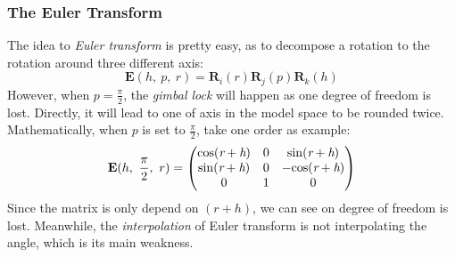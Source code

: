\documentclass[10pt, a4paper]{article}
\begin{document}
            \subsubsection{The Euler Transform}
                The idea to \emph{Euler transform} is pretty easy, as to decompose a rotation to the rotation around three different axis:
                $$\textbf{E}(h,\ p,\ r) = \textbf{R}_i(r)\textbf{R}_j(p)\textbf{R}_k(h)$$
                \indent However, when $p = \frac{\pi}{2}$, the \emph{gimbal lock} will happen as one degree of freedom is lost. Directly, it will lead to one of axis in the model space to be rounded twice. Mathematically, when $p$ is set to $\frac{\pi}{2}$, take one order as example: 
                \begin{equation*}
                    \textbf{E}(h,\ \frac{\pi}{2},\ r) =
                    \begin{pmatrix}
                        \rm{cos}(\emph{r} + \emph{h}) & 0 & \rm{sin}(\emph{r} + \emph{h}) \\
                        \rm{sin}(\emph{r} + \emph{h}) & 0 & \rm{-cos}(\emph{r} + \emph{h})\\
                        0 & 1 & 0
                    \end{pmatrix}
                \end{equation*}
                \indent Since the matrix is only depend on $(r + h)$, we can see on degree of freedom is lost. Meanwhile, the \emph{interpolation} of Euler transform is not interpolating the angle, which is its main weakness. 
                
\end{document}
